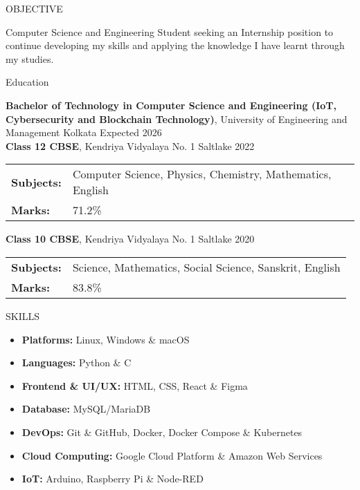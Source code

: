 \documentclass{resume}
\begin{document}
\vspace{0.8em}
\begin{rSection}{OBJECTIVE}

{Computer Science and Engineering Student seeking an Internship position to continue developing my skills and applying the knowledge I have learnt through my studies.}

\end{rSection}
\vspace{0.8em}
\begin{rSection}{Education}

{\bf Bachelor of Technology in Computer Science and Engineering (IoT, Cybersecurity and Blockchain Technology)}, University of Engineering and Management Kolkata \hfill {Expected 2026}\\

{\bf Class 12 CBSE}, Kendriya Vidyalaya No. 1 Saltlake \hfill {2022}\\
\begin{tabular}{>{\bfseries}l l}
Subjects: & Computer Science, Physics, Chemistry, Mathematics, English \\
Marks: & 71.2\%
\end{tabular}

{\bf Class 10 CBSE}, Kendriya Vidyalaya No. 1 Saltlake \hfill {2020}
\begin{tabular}{>{\bfseries}l l}
Subjects: & Science, Mathematics, Social Science, Sanskrit, English \\
Marks: & 83.8\%
\end{tabular}


\end{rSection}
\vspace{0.8em}
\begin{rSection}{SKILLS}

\begin{itemize}
    \item \textbf{Platforms:} Linux, Windows \& macOS
    \item \textbf{Languages:} Python \& C
    \item \textbf{Frontend \& UI/UX: } HTML, CSS, React \& Figma
    \item \textbf{Database: } MySQL/MariaDB
    \item \textbf{DevOps:} Git \& GitHub, Docker, Docker Compose \& Kubernetes
    \item \textbf{Cloud Computing:} Google Cloud Platform \& Amazon Web Services
    \item \textbf{IoT:} Arduino, Raspberry Pi \& Node-RED
\end{itemize}
\end{rSection}
\end{document}
